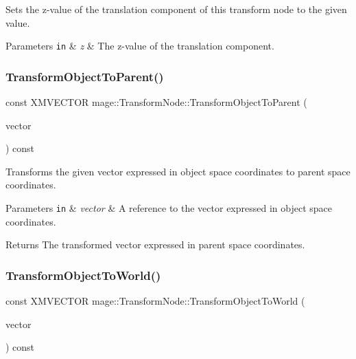 Sets the z-\/value of the translation component of this transform node to the given value.


\begin{DoxyParams}[1]{Parameters}
\mbox{\tt in}  & {\em z} & The z-\/value of the translation component. \\
\hline
\end{DoxyParams}
\hypertarget{classmage_1_1_transform_node_a4307cdcb0d013550777cd77ec963a5d9}{}\label{classmage_1_1_transform_node_a4307cdcb0d013550777cd77ec963a5d9} 
\subsubsection{\texorpdfstring{Transform\+Object\+To\+Parent()}{TransformObjectToParent()}}
{\footnotesize\ttfamily const X\+M\+V\+E\+C\+T\+OR mage\+::\+Transform\+Node\+::\+Transform\+Object\+To\+Parent (\begin{DoxyParamCaption}\item[{const X\+M\+V\+E\+C\+T\+OR \&}]{vector }\end{DoxyParamCaption}) const}

Transforms the given vector expressed in object space coordinates to parent space coordinates.


\begin{DoxyParams}[1]{Parameters}
\mbox{\tt in}  & {\em vector} & A reference to the vector expressed in object space coordinates. \\
\hline
\end{DoxyParams}
\begin{DoxyReturn}{Returns}
The transformed vector expressed in parent space coordinates. 
\end{DoxyReturn}
\hypertarget{classmage_1_1_transform_node_af147669a4717d79c98c249522f1e9192}{}\label{classmage_1_1_transform_node_af147669a4717d79c98c249522f1e9192} 
\subsubsection{\texorpdfstring{Transform\+Object\+To\+World()}{TransformObjectToWorld()}}
{\footnotesize\ttfamily const X\+M\+V\+E\+C\+T\+OR mage\+::\+Transform\+Node\+::\+Transform\+Object\+To\+World (\begin{DoxyParamCaption}\item[{const X\+M\+V\+E\+C\+T\+OR \&}]{vector }\end{DoxyParamCaption}) const}

